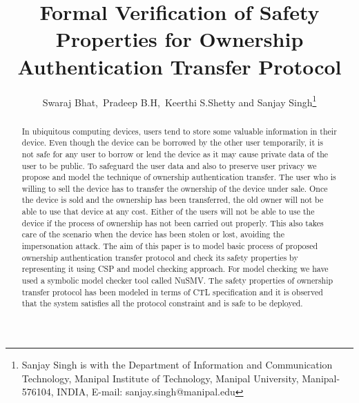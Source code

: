 \documentclass[letterpaper]{article}
\begin{document}
\title{Formal Verification of Safety Properties for Ownership Authentication Transfer Protocol}
\author{Swaraj Bhat,~Pradeep B.H,~Keerthi S.Shetty  and Sanjay Singh\thanks {Sanjay Singh is with the Department of Information and Communication Technology, Manipal Institute of Technology, Manipal University, Manipal-576104, INDIA, E-mail: sanjay.singh@manipal.edu}}


\maketitle
\begin{abstract}
In ubiquitous computing devices, users tend to store some valuable information in their device. Even though the device can be borrowed by the other user temporarily, it is not safe for any user to borrow or lend the device as it may cause private data of the user to be public. To safeguard the user data and also to preserve user privacy we propose and model the technique of ownership authentication transfer. The user who is willing to sell the device has to transfer the ownership of the device under sale. Once the device is sold and the ownership has been transferred, the old owner will not be able to use that device at any cost. Either of the users will not be able to use the device if the process of ownership has not been carried out properly. This also takes care of the scenario when the device has been stolen or lost, avoiding the impersonation attack. The aim of this paper is to model basic process of proposed ownership authentication transfer protocol and check its safety properties by representing it using CSP and model checking approach. For model checking we have used a symbolic model checker tool called NuSMV. The safety properties of ownership transfer protocol has been modeled in terms of CTL specification and it is observed that the system satisfies all the protocol constraint and is safe to be deployed.
\end{abstract}
\end{document}
